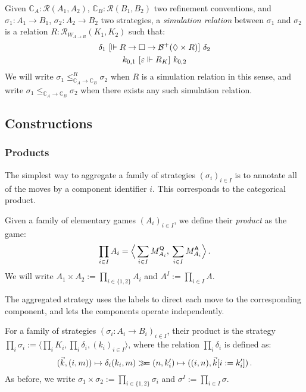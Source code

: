 \begin{definition} %
Given
$\mathbb{C}_A : \mathcal{R}(A_1, A_2)$,
$\mathbb{C}_B : \mathcal{R}(B_1, B_2)$
two refinement conventions, and
$\sigma_1 : A_1 \rightarrow B_1$,
$\sigma_2 : A_2 \rightarrow B_2$
two strategies,
a \emph{simulation relation} between $\sigma_1$ and $\sigma_2$
is a relation $R : \mathcal{R}_{W_{\!A \rightarrow B}}(K_1, K_2)$
such that:
\begin{gather*}
  \delta_1
  \ [{\Vdash R \rightarrow \Box \rightarrow \mathcal{B}^+(\Diamond \times R)}]\ 
  \delta_2
  \\
  k_{0,1} \ [{\varepsilon \Vdash R_K}]\  k_{0,2}
\end{gather*}
We will write
$\sigma_1 \le_{\mathbb{C}_A \rightarrow \mathbb{C}_B}^R \sigma_2$
when $R$ is a simulation relation in this sense, and write
$\sigma_1 \le_{\mathbb{C}_A \rightarrow \mathbb{C}_B} \sigma_2$
when there exists any such simulation relation.
\end{definition}


\subsection{Constructions} %

\subsubsection{Products} %

The simplest way to aggregate a family of strategies $(\sigma_i)_{i \in I}$
is to annotate all of the moves by a component identifier $i$.
This corresponds to the categorical product.

\begin{definition} %
Given a family of elementary games $(A_i)_{i \in I}$,
we define their \emph{product} as the game:
\[ \prod_{i \in I} A_i =
   \Big\langle \sum_{i \in I} M_{A_i}^{ \mathsf{Q} },
            \: \sum_{i \in I} M_{A_i}^{ \mathsf{A} } \Big\rangle \,. \]
We will write $A_1 \times A_2 := \prod_{i \in \{1, 2\}} A_i$
and $A^I := \prod_{i \in I} A$.
\end{definition}

The aggregated strategy uses the labels to direct each move
to the corresponding component,
and lets the components operate independently.

\begin{definition} %
For a family of strategies
$(\sigma_i : A_i \rightarrow B_i)_{i \in I}$,
their product is the strategy
$\prod_i \sigma_i := \langle \prod_i K_i, \prod_i \delta_i, (k_i)_{i\in I} \rangle$,
where the relation
$\prod_i \delta_i$
is defined as:
\[
  (\vec{k}, (i, m)) \mapsto
    \delta_i(k_i, m) \gg\!\!= (n, k_i') \mapsto ((i, n), \vec{k}[i := k_i']) \,.
\]
As before,
we write $\sigma_1 \times \sigma_2 := \prod_{i \in \{1, 2\}} \sigma_i$
and $\sigma^I := \prod_{i \in I} \sigma$.
\end{definition}

